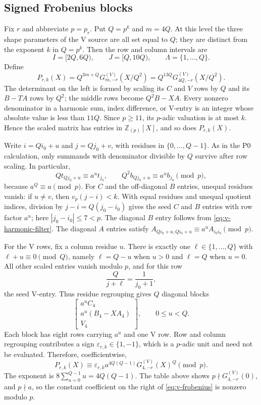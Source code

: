 \subsection{Signed Frobenius blocks}

Fix $r$ and abbreviate $p=p_r$.  Put $Q=p^k$ and $m=4Q$.  At this level the
three shape parameters of the V source are all set equal to \(Q\); they are
distinct from the exponent \(k\) in \(Q=p^k\).  Then the row and column
intervals are
\[
 I=[2Q,6Q),\qquad J=[Q,10Q),\qquad \Lambda=\{1,\ldots,Q\}.
\]
Define
\begin{equation}\label{eq:v-scaled-polynomial}
 P_{r,k}(X)=Q^{3m+Q}G^{(V)}_{m,-r}(X/Q^2)
              =Q^{13Q}G^{(V)}_{4Q,-r}(X/Q^2).
\end{equation}
The determinant on the left is formed by scaling its $C$ and $V$ rows by
$Q$ and its $B-TA$ rows by $Q^2$; the middle rows become $Q^2B-XA$.
Every nonzero denominator in a harmonic sum, index difference, or V-entry is
an integer whose absolute value is less than $11Q$.  Since $p\ge11$, its $p$-adic valuation is
at most $k$.  Hence the scaled matrix has entries in
$\mathbb Z_{(p)}[X]$, and so does $P_{r,k}(X)$.

Write $i=Qi_0+u$ and $j=Qj_0+v$, with residues in $\{0,\ldots,Q-1\}$.
As in the P0 calculation, only summands with denominator divisible by $Q$
survive after row scaling.  In particular,
\begin{equation}\label{eq:v-harmonic-filter}
 Q t_{Qj_0+u}\equiv a^u t_{j_0},\qquad
 Q^2 b_{Qj_0+u}\equiv a^u b_{j_0}\pmod p,
\end{equation}
because $a^Q\equiv a\pmod p$.  For $C$ and the off-diagonal $B$ entries,
unequal residues vanish: if $u\ne v$, then $v_p(j-i)<k$.  With equal
residues and unequal quotient indices, division by $j-i=Q(j_0-i_0)$ gives
the seed $C$ and $B$ entries with row factor $a^u$; here
$|j_0-i_0|\le7<p$.  The diagonal $B$ entry follows from
\eqref{eq:v-harmonic-filter}.  The diagonal $A$ entries satisfy
$A_{Qi_0+u,Qi_0+u}\equiv a^uA_{i_0i_0}\pmod p$.

For the V rows, fix a column residue $u$.  There is exactly one
$\ell\in\{1,\ldots,Q\}$ with $\ell+u\equiv0\pmod Q$, namely
$\ell=Q-u$ when $u>0$ and $\ell=Q$ when $u=0$.  All other scaled entries
vanish modulo $p$, and for this row
\[
 \frac{Q}{j+\ell}=\frac1{j_0+1},
\]
the seed V-entry.  Thus residue regrouping gives $Q$ diagonal blocks
\[
 \begin{bmatrix}a^u C_4\\ a^u(B_4-XA_4)\\ V_4\end{bmatrix},
 \qquad 0\le u<Q.
\]
Each block has eight rows carrying $a^u$ and one V row.  Row and column
regrouping contributes a sign $\varepsilon_{r,k}\in\{1,-1\}$, which is a
$p$-adic unit and need not be evaluated.  Therefore, coefficientwise,
\begin{equation}\label{eq:v-frobenius}
 P_{r,k}(X)\equiv
 \varepsilon_{r,k}a^{4Q(Q-1)}G^{(V)}_{4,-r}(X)^Q\pmod p.
\end{equation}
The exponent is $8\sum_{u=0}^{Q-1}u=4Q(Q-1)$.  The table above shows
$p\nmid G^{(V)}_{4,-r}(0)$, and $p\nmid a$, so the constant coefficient
on the right of \eqref{eq:v-frobenius} is nonzero modulo $p$.

